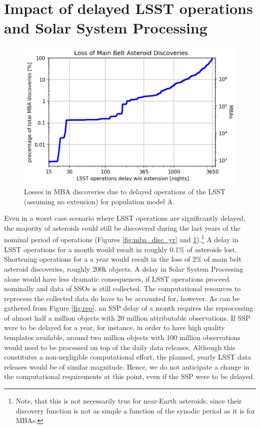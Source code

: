 \section{Impact of delayed LSST operations and Solar System Processing} \label{sec:delay}
\begin{figure}[tb!]
\begin{center}
\includegraphics[width=0.70\linewidth]{figs/lost4.png}
\end{center}
\caption{Losses in MBA discoveries due to delayed operations of the LSST (assuming no extension) for population model A.}
\label{fig:lost}       %
\end{figure}
Even in a worst case scenario where LSST operations are significantly delayed, the majority of asteroids could still be discovered during the last years of the nominal period of operations (Figures \ref{fig:mba_disc_yr} and \ref{fig:lost}).\footnote{Note, that this is not necessarily true for near-Earth asteroids, since their discovery function is not as simple a function of the synodic period as it is for MBAs.} 
A delay in LSST operations for a month would result in roughly 0.1\% of asteroids lost. Shortening operations for a 
a year would result in the loss of 2\% of main belt asteroid discoveries, roughly 200k objects.
A delay in Solar System Processing alone would have less dramatic consequences, if LSST operations proceed nominally and data of SSOs is still collected.
The computational resources to reprocess the collected data do have to be accounted for, however. As can be gathered from Figure \ref{fig:rep}, an SSP delay of a month requires the reprocessing of almost half a million objects with 20 million attributable observations. If SSP were to be delayed for a year, for instance, in order to have high quality templates available, around two million objects with 100 million observations would need to be processed on top of the daily data releases. Although this constitutes a non-negligible computational effort, the planned, yearly LSST data releases would be of similar magnitude. Hence, we do not anticipate a change in the computational requirements at this point, even if the SSP were to be delayed.
